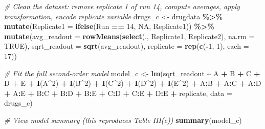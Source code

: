 \documentclass[
]{article}
\newenvironment{Shaded}{\begin{snugshade}}{\end{snugshade}}
\newcommand{\AttributeTok}[1]{\textcolor[rgb]{0.13,0.29,0.53}{#1}}
\newcommand{\CommentTok}[1]{\textcolor[rgb]{0.56,0.35,0.01}{\textit{#1}}}
\newcommand{\ConstantTok}[1]{\textcolor[rgb]{0.56,0.35,0.01}{#1}}
\newcommand{\DecValTok}[1]{\textcolor[rgb]{0.00,0.00,0.81}{#1}}
\newcommand{\FunctionTok}[1]{\textcolor[rgb]{0.13,0.29,0.53}{\textbf{#1}}}
\newcommand{\NormalTok}[1]{#1}
\newcommand{\OtherTok}[1]{\textcolor[rgb]{0.56,0.35,0.01}{#1}}
\newcommand{\SpecialCharTok}[1]{\textcolor[rgb]{0.81,0.36,0.00}{\textbf{#1}}}
\begin{document}
\begin{Shaded}
\begin{Highlighting}[]
\CommentTok{\# Clean the dataset: remove replicate 1 of run 14, compute averages, apply transformation, encode replicate variable}
\NormalTok{drugs\_c }\OtherTok{\textless{}{-}}\NormalTok{ drugdata }\SpecialCharTok{\%\textgreater{}\%}
  \FunctionTok{mutate}\NormalTok{(}\AttributeTok{Replicate1 =} \FunctionTok{ifelse}\NormalTok{(Run }\SpecialCharTok{==} \DecValTok{14}\NormalTok{, }\ConstantTok{NA}\NormalTok{, Replicate1)) }\SpecialCharTok{\%\textgreater{}\%}
  \FunctionTok{mutate}\NormalTok{(}\AttributeTok{avg\_readout =} \FunctionTok{rowMeans}\NormalTok{(}\FunctionTok{select}\NormalTok{(., Replicate1, Replicate2), }\AttributeTok{na.rm =} \ConstantTok{TRUE}\NormalTok{),}
         \AttributeTok{sqrt\_readout =} \FunctionTok{sqrt}\NormalTok{(avg\_readout),}
         \AttributeTok{replicate =} \FunctionTok{rep}\NormalTok{(}\FunctionTok{c}\NormalTok{(}\SpecialCharTok{{-}}\DecValTok{1}\NormalTok{, }\DecValTok{1}\NormalTok{), }\AttributeTok{each =} \DecValTok{17}\NormalTok{))}

\CommentTok{\# Fit the full second{-}order model}
\NormalTok{model\_c }\OtherTok{\textless{}{-}} \FunctionTok{lm}\NormalTok{(sqrt\_readout }\SpecialCharTok{\textasciitilde{}}\NormalTok{ A }\SpecialCharTok{+}\NormalTok{ B }\SpecialCharTok{+}\NormalTok{ C }\SpecialCharTok{+}\NormalTok{ D }\SpecialCharTok{+}\NormalTok{ E }\SpecialCharTok{+}
                \FunctionTok{I}\NormalTok{(A}\SpecialCharTok{\^{}}\DecValTok{2}\NormalTok{) }\SpecialCharTok{+} \FunctionTok{I}\NormalTok{(B}\SpecialCharTok{\^{}}\DecValTok{2}\NormalTok{) }\SpecialCharTok{+} \FunctionTok{I}\NormalTok{(C}\SpecialCharTok{\^{}}\DecValTok{2}\NormalTok{) }\SpecialCharTok{+} \FunctionTok{I}\NormalTok{(D}\SpecialCharTok{\^{}}\DecValTok{2}\NormalTok{) }\SpecialCharTok{+} \FunctionTok{I}\NormalTok{(E}\SpecialCharTok{\^{}}\DecValTok{2}\NormalTok{) }\SpecialCharTok{+}
\NormalTok{                A}\SpecialCharTok{:}\NormalTok{B }\SpecialCharTok{+}\NormalTok{ A}\SpecialCharTok{:}\NormalTok{C }\SpecialCharTok{+}\NormalTok{ A}\SpecialCharTok{:}\NormalTok{D }\SpecialCharTok{+}\NormalTok{ A}\SpecialCharTok{:}\NormalTok{E }\SpecialCharTok{+}
\NormalTok{                B}\SpecialCharTok{:}\NormalTok{C }\SpecialCharTok{+}\NormalTok{ B}\SpecialCharTok{:}\NormalTok{D }\SpecialCharTok{+}\NormalTok{ B}\SpecialCharTok{:}\NormalTok{E }\SpecialCharTok{+}
\NormalTok{                C}\SpecialCharTok{:}\NormalTok{D }\SpecialCharTok{+}\NormalTok{ C}\SpecialCharTok{:}\NormalTok{E }\SpecialCharTok{+}\NormalTok{ D}\SpecialCharTok{:}\NormalTok{E }\SpecialCharTok{+}
\NormalTok{                replicate,}
              \AttributeTok{data =}\NormalTok{ drugs\_c)}

\CommentTok{\# View model summary (this reproduces Table III(c))}
\FunctionTok{summary}\NormalTok{(model\_c)}
\end{Highlighting}
\end{Shaded}
\end{document}
